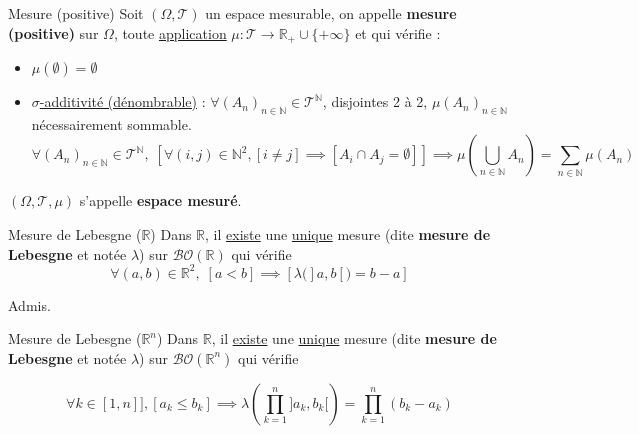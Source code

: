 \begin{Definition}[colbacktitle=red!75!black]{Mesure (positive)}{}
  Soit $(\Omega, \mathcal{T})$  un espace mesurable, on appelle \textbf{mesure (positive)} sur $\Omega$, toute \underline{application} $\mu : \mathcal{T} \to \mathbb{R}_+ \cup \{ + \infty\}$ et qui vérifie :
  \begin{itemize}

      \item $\mu(\emptyset) = \emptyset$ 
      \item \underline{$\sigma$-additivité (dénombrable)} : $\forall (A_n) _{n \in \mathbb{N}} \in \mathcal{T} ^{\mathbb{N}}$, disjointes 2 à 2, $\mu(A_n) _{n \in \mathbb{N}}$ nécessairement sommable.
        \begin{equation}
          \forall (A_n) _{n \in \mathbb{N}} \in \mathcal{T} ^{\mathbb{N}}, \; \left[\forall (i,j) \in \mathbb{N} ^{2}, [i \ne j] \implies [A_i \cap A_j = \emptyset]\right] \implies \boxed{\mu \left( \bigcup _{n \in \mathbb{N}} A_n \right) = \sum_{n \in \mathbb{N}}^{} \mu(A_n)}
        \end{equation}

  \end{itemize}

  $(\Omega, \mathcal{T}, \mu)$ s'appelle \textbf{espace mesuré}.
\end{Definition}

\begin{Theorem}{Mesure de Lebesgne ($\mathbb{R}$)}{}
 Dans $\mathbb{R}$, il \underline{existe} une \underline{unique} mesure (dite \textbf{mesure de Lebesgne} et notée $\lambda$) sur $\mathcal{BO}(\mathbb{R})$ qui vérifie
\begin{equation}
  \forall (a,b) \in \mathbb{R} ^{2}, \; [a<b] \implies [\lambda(]a,b[) = b-a]
\end{equation}
\end{Theorem}

\begin{myproof}{}{}
Admis.
\end{myproof}
\begin{Theorem}{Mesure de Lebesgne ($\mathbb{R} ^{n}$)}{}
 Dans $\mathbb{R}$, il \underline{existe} une \underline{unique} mesure (dite \textbf{mesure de Lebesgne} et notée $\lambda$) sur $\mathcal{BO}(\mathbb{R } ^{n})$ qui vérifie

\begin{equation}
  \forall k \in [\!1, n]\!], [a_k \le b_k] \implies \lambda \left( \prod_{k=1}^{n}]a_k, b_k[ \right) = \prod_{k=1}^{n} (b_k - a_k)
\end{equation}
\end{Theorem}

